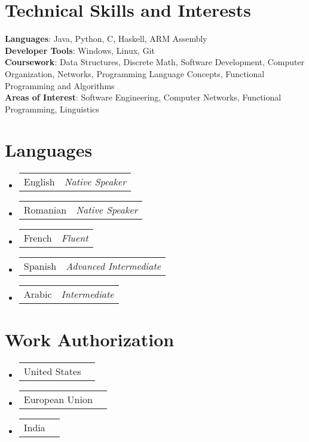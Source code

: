 \documentclass[a4paper,11pt]{article}
\makeatletter
\newcommand{\resumePOR}[3]{
\vspace{0.5mm}\item
    \begin{tabular*}{0.97\textwidth}[t]{l@{\extracolsep{\fill}}r}
        {#1}\hspace{0.3mm}#2 & \textit{\small{#3}} 
    \end{tabular*}
    \vspace{-2mm}
}
\newcommand{\resumeSubHeadingListStart}{\begin{itemize}[leftmargin=*,labelsep=0mm]}
\newcommand{\resumeSubHeadingListEnd}{\end{itemize}\vspace{2mm}}
\makeatother
\begin{document}
\section{\textbf{Technical Skills and Interests}}
 \begin{itemize}[leftmargin=0.05in, label={}]
    \small{\item{
     \textbf{Languages}{: Java, Python, C, Haskell, ARM Assembly } \\
       \textbf{Developer Tools}{: Windows, Linux, Git } \\

     \textbf{Coursework}{: Data Structures, Discrete Math, Software Development, Computer Organization, Networks, Programming Language Concepts, Functional Programming and Algorithms} \\

     \textbf{Areas of Interest}{: Software Engineering, Computer Networks, Functional Programming, Linguistics } \\
    }}
 \end{itemize}
 \vspace{-16pt}



\section{\textbf{Languages}}
\vspace{-0.4mm}
\resumeSubHeadingListStart
\resumePOR{English} %
    {} %
    {Native Speaker} %
\resumePOR{Romanian } %
    {} %
    {Native Speaker} %
\resumePOR{French } %
    {} %
    {Fluent} %
\resumePOR{Spanish } %
    {} %
    {Advanced Intermediate} %
\resumePOR{Arabic } %
    {} %
    {Intermediate} %
\resumeSubHeadingListEnd
\vspace{-5mm}




\section{\textbf{Work Authorization}}
\vspace{-0.4mm}
\resumeSubHeadingListStart
\resumePOR{United States } %
    {} %
    {} %
    
\resumePOR{European Union } %
    {} %
    {} %
\resumePOR{India } %
    {} %
    {} %
\resumeSubHeadingListEnd
\vspace{-5mm}



\end{document}
